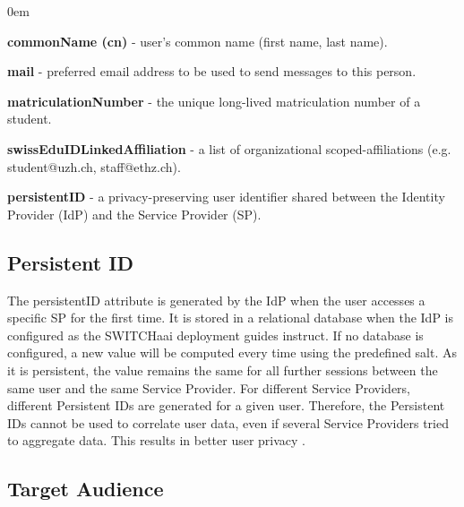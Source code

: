 \begin{description}
	\itemsep0em
	\item\textbf{commonName (cn)} - user's common name (first name, last name).
	\item\textbf{mail} - preferred email address to be used to send messages to this person.
	\item\textbf{matriculationNumber} - the unique long-lived matriculation number of a student.
	\item\textbf{swissEduIDLinkedAffiliation} - a list of organizational scoped-affiliations (e.g. student@uzh.ch, staff@ethz.ch).
	\item\textbf{persistentID} - a privacy-preserving user identifier shared between the Identity Provider (IdP) and the Service Provider (SP).
\end{description}

\subsection{Persistent ID} \label{persistent-id}

The persistentID attribute is generated by the IdP when the user accesses a specific SP for the first time. It is stored in a relational database when the IdP is configured as the SWITCHaai deployment guides instruct. If no database is configured, a new value will be computed every time using the predefined salt. As it is persistent, the value remains the same for all further sessions between the same user and the same Service Provider. For different Service Providers, different Persistent IDs are generated for a given user. Therefore, the Persistent IDs cannot be used to correlate user data, even if several Service Providers tried to aggregate data. This results in better user privacy \cite{persistent-id}.




\subsection{Target Audience} \label{ssec:iam-target-audience}

